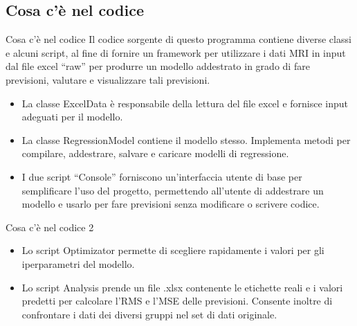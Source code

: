 \documentclass{beamer}
\begin{document}

\subsection{Cosa c'è nel codice}
\begin{frame}{Cosa c'è nel codice}
Il codice sorgente di questo programma contiene diverse classi e alcuni script, al fine di fornire un framework per utilizzare i dati MRI in input dal file excel ``raw'' per produrre un modello addestrato in grado di fare previsioni, valutare e visualizzare tali previsioni.
\pause
    \begin{itemize}
		\item La classe ExcelData è responsabile della lettura del file excel e fornisce input adeguati per il modello.
\pause
		\item La classe RegressionModel contiene il modello stesso. Implementa metodi per compilare, addestrare, salvare e caricare modelli di regressione.
\pause
        \item I due script ``Console'' forniscono un'interfaccia utente di base per semplificare l'uso del progetto, permettendo all'utente di addestrare un modello e usarlo per fare previsioni senza modificare o scrivere codice.
    \end{itemize}
\end{frame}



\begin{frame}{Cosa c'è nel codice 2}
    \begin{itemize}
        \item Lo script Optimizator permette di scegliere rapidamente i valori per gli iperparametri del modello.
\pause
		\item Lo script Analysis prende un file .xlsx contenente le etichette reali e i valori predetti per calcolare l'RMS e l'MSE delle previsioni. Consente inoltre di confrontare i dati dei diversi gruppi nel set di dati originale.
    \end{itemize}
\end{frame}


\end{document}
